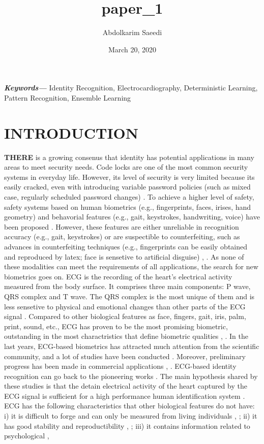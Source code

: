 \documentclass[onecolumn,12pt]{article}
\providecommand{\keywords}[1]{\textbf{\textit{Keywords---}} #1}
\begin{document}
\title{ paper_1 }
\author{Abdolkarim Saeedi}
\date{March 20, 2020}
\maketitle
{}
\newpage
\keywords{Identity Recognition, Electrocardiography, Deterministic Learning, Pattern Recognition, Ensemble Learning}
\section{\large \color{blue}INTRODUCTION}
\textbf{{\LARGE T}HERE} is a growing consenus that identity has potential applications in many areas to meet security needs. Code locks are one of the most common security systems in everyday life. However, its level of security is very limited because its easily cracked, even with introducing variable password policies (such as mixed case, regularly scheduled password changes) \cite{citation1}. To achieve a higher level of safety, safety systems based on human biometrics (e.g., fingerprints, faces, irises, hand geometry) and behavorial features (e.g., gait, keystrokes, handwriting, voice) have been proposed \cite{citation2}. However, these features are either unreliable in recognition accuracy (e.g., gait, keystrokes) or are suspectible to counterfeiting, such as advances in counterfeiting techniques (e.g., fingerprints can be easily obtained and reproduced by latex; face is sensetive to artificial disguise) \cite{citation3}, \cite{citation4}. As none of these modalities can meet the requirements of all applications, the search for new biometrics goes on. ECG is the recording of the heart's electrical activity measured from the body surface. It comprises three main components: P wave, QRS complex and T wave. The QRS complex is the most unique of them and is less sensetive to physical and emotional changes than other parts of the ECG signal \cite{citation3}. Compared to other biological features as face, fingers, gait, iris, palm, print, sound, etc., ECG has proven to be the most promising biometric, outstanding in the most charactristics that define biometric qualities \cite{citation5}, \cite{citation6}. In the last years, ECG-based biometrics has attracted much attention from the scientific community, and a lot of studies have been conducted \cite{citation7, citation8, citation9, citation10, citation11, citation12}. Moreover, preliminary progress has been made in commercial applications \cite{citation13}, \cite{citation14}. ECG-based identity recognition can go back to the pioneering works \cite{citation15, citation16, citation17}. The main hypothesis shared by these studies is that the detain electrical activity of the heart captured by the ECG signal is sufficient for a high performance human identification system \cite{citation18}. ECG has the following characteristics that other biological features do not have: i) it is difficult to forge and can only be measured from living individuals \cite{citation18}, \cite{citation19}; ii) it has good stability and reproductibility \cite{citation15}, \cite{citation20}; iii) it contains information related to psychological , 
\end{document}
